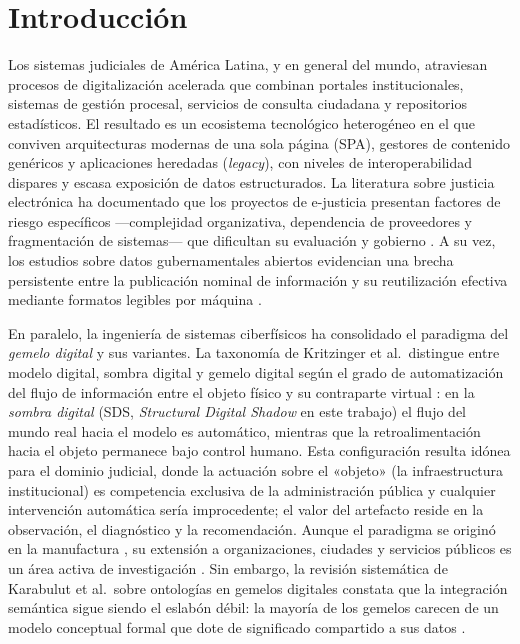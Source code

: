 \documentclass[computers,article,submit,pdftex,moreauthors]{Definitions/mdpi}
\begin{document}
\section{Introducción}
\label{sec:intro}

Los sistemas judiciales de América Latina, y en general del mundo, atraviesan procesos de digitalización acelerada que combinan portales institucionales, sistemas de gestión procesal, servicios de consulta ciudadana y repositorios estadísticos. El resultado es un ecosistema tecnológico heterogéneo en el que conviven arquitecturas modernas de una sola página (SPA), gestores de contenido genéricos y aplicaciones heredadas (\emph{legacy}), con niveles de interoperabilidad dispares y escasa exposición de datos estructurados. La literatura sobre justicia electrónica ha documentado que los proyectos de e-justicia presentan factores de riesgo específicos —complejidad organizativa, dependencia de proveedores y fragmentación de sistemas— que dificultan su evaluación y gobierno \cite{Rosa2013}. A su vez, los estudios sobre datos gubernamentales abiertos evidencian una brecha persistente entre la publicación nominal de información y su reutilización efectiva mediante formatos legibles por máquina \cite{Janssen2012,Attard2015}.

En paralelo, la ingeniería de sistemas ciberfísicos ha consolidado el paradigma del \emph{gemelo digital} y sus variantes. La taxonomía de Kritzinger et al.\ distingue entre modelo digital, sombra digital y gemelo digital según el grado de automatización del flujo de información entre el objeto físico y su contraparte virtual \cite{Kritzinger2018}: en la \emph{sombra digital} (SDS, \emph{Structural Digital Shadow} en este trabajo) el flujo del mundo real hacia el modelo es automático, mientras que la retroalimentación hacia el objeto permanece bajo control humano. Esta configuración resulta idónea para el dominio judicial, donde la actuación sobre el «objeto» (la infraestructura institucional) es competencia exclusiva de la administración pública y cualquier intervención automática sería improcedente; el valor del artefacto reside en la observación, el diagnóstico y la recomendación. Aunque el paradigma se originó en la manufactura \cite{Tao2019,Jones2020,Fuller2020,Semeraro2021}, su extensión a organizaciones, ciudades y servicios públicos es un área activa de investigación \cite{Shahat2021,BotinSanabria2022,Brauner2022}. Sin embargo, la revisión sistemática de Karabulut et al.\ sobre ontologías en gemelos digitales constata que la integración semántica sigue siendo el eslabón débil: la mayoría de los gemelos carecen de un modelo conceptual formal que dote de significado compartido a sus datos \cite{Karabulut2024}.
\end{document}
